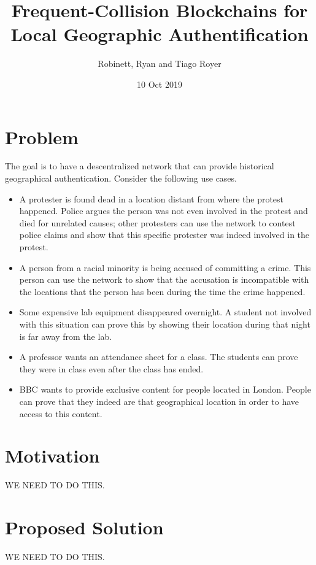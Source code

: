 \documentclass{article}
\title{Frequent-Collision Blockchains for Local Geographic Authentification}
\author{Robinett, Ryan and Tiago Royer}
\date{10 Oct 2019}
\begin{document}
\maketitle

\section*{Problem}

The goal is to have a descentralized network
that can provide historical geographical authentication.
Consider the following use cases.

\begin{itemize}
	\item A protester is found dead in a location distant from where the protest happened.
		Police argues the person was not even involved in the protest
		and died for unrelated causes;
		other protesters can use the network to contest police claims
		and show that this specific protester was indeed involved in the protest.

	\item A person from a racial minority is being accused of committing a crime.
		This person can use the network to show that the accusation
		is incompatible with the locations that the person has been
		during the time the crime happened.

	\item Some expensive lab equipment disappeared overnight.
		A student not involved with this situation
		can prove this by showing their location during that night
		is far away from the lab.

	\item A professor wants an attendance sheet for a class.
		The students can prove they were in class
		even after the class has ended.

	\item BBC wants to provide exclusive content for people located in London.
		People can prove that they indeed are that geographical location
		in order to have access to this content.
\end{itemize}


\section*{Motivation}
WE NEED TO DO THIS.

\section*{Proposed Solution}
WE NEED TO DO THIS.
\end{document}
